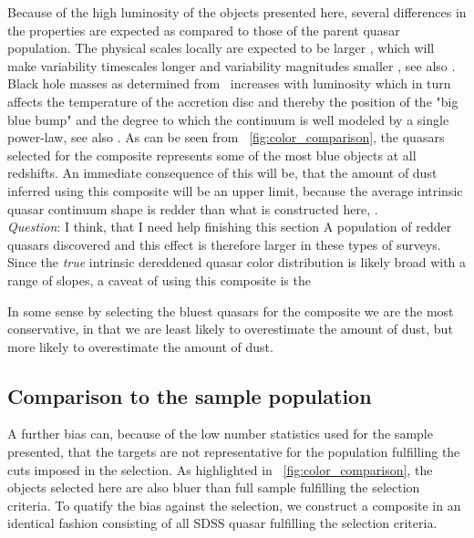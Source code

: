 \documentclass{aa}    %
\newcommand{\figref}[1]{\ref{fig:#1}}
\newcommand{\Fig}[1]{\figurename~\figref{#1}}
\newcommand{\fig}[1]{\Fig{#1}}
\newcommand{\sectlabel}[1]{\label{sect:#1}}
\newcommand{\mgii}{\ion{Mg}{ii}}
\newcommand{\todo}[3]{{\color{#2}\emph{#1}: #3}}
\newcommand{\qtodo}[1]{\todo{\\ Question}{red}{#1}}
\begin{document}
Because of the high luminosity of the objects presented here, several differences in the properties are expected as compared to those of the parent quasar population. The physical scales locally are expected to be larger \citep{Bentz2013}, which will make variability timescales longer and variability magnitudes smaller \citep{VandenBerk2004}, see also \cite{Schmidt2012}. Black hole masses as determined from \mgii~increases with luminosity \cite{wu2015} which in turn affects the temperature of the accretion disc \citep{shakura1973} and thereby the position of the "big blue bump" and the degree to which the continuum is well modeled by a single power-law, see also \cite{Lusso2015}. As can be seen from \fig{color_comparison}, the quasars selected for the composite represents some of the most blue objects at all redshifts. An immediate consequence of this will be, that the amount of dust inferred using this composite will be an upper limit, because the average intrinsic quasar continuum shape is redder than what is constructed here, \citep{Richards2003, Hopkins2004a}. \qtodo{I think, that I need help finishing this section}
 A population of redder quasars discovered \cite{Glikman2012} and this effect is therefore larger in these types of surveys. 
Since the \textit{true} intrinsic dereddened quasar color distribution is likely broad with a range of slopes, a caveat of using this composite is the 

In some sense by selecting the bluest quasars for the composite we are the most conservative, in that we are least likely to overestimate the amount of dust, but more likely to overestimate the amount of dust. 



\subsection{Comparison to the sample population}  \sectlabel{sample_pop}



A further bias can, because of the low number statistics used for the sample presented, that the targets are not representative for the population fulfilling the cuts imposed in the selection. As highlighted in \fig{color_comparison}, the objects selected here are also bluer than full sample fulfilling the selection criteria. To quatify the bias against the selection, we construct a composite in an identical fashion consisting of all SDSS quasar fulfilling the selection criteria. 
\end{document}
